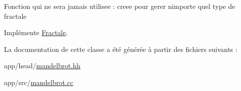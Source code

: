 Fonction qui ne sera jamais utilisee \+: creee pour gerer nimporte quel type de fractale 

Implémente \hyperlink{classFractale_a535969c022c88b7968784e160f41e1c3}{Fractale}.



La documentation de cette classe a été générée à partir des fichiers suivants \+:\begin{DoxyCompactItemize}
\item 
app/head/\hyperlink{mandelbrot_8hh}{mandelbrot.\+hh}\item 
app/src/\hyperlink{mandelbrot_8cc}{mandelbrot.\+cc}\end{DoxyCompactItemize}
